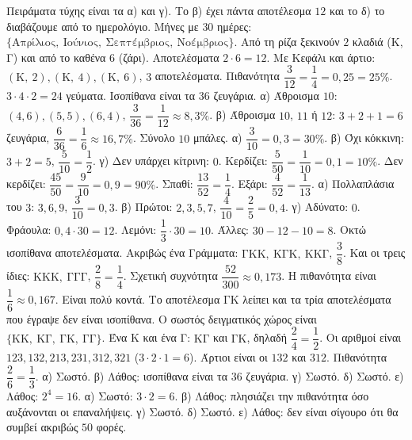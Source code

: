  Πειράματα τύχης είναι τα α) και γ). Το β) έχει πάντα αποτέλεσμα $12$ και το δ) το διαβάζουμε από το ημερολόγιο.
 Μήνες με $30$ ημέρες: $\{\text{Απρίλιος},\ \text{Ιούνιος},\ \text{Σεπτέμβριος},\ \text{Νοέμβριος}\}$.
 Από τη ρίζα ξεκινούν $2$ κλαδιά (Κ, Γ) και από το καθένα $6$ (ζάρι). Αποτελέσματα $2\cdot6=12$. Με Κεφάλι και άρτιο: $(\mathrm{Κ},\ 2),(\mathrm{Κ},\ 4),(\mathrm{Κ},\ 6)$, $3$ αποτελέσματα. Πιθανότητα $\dfrac{3}{12}=\dfrac{1}{4}=0{,}25=25\%$.
 $3\cdot4\cdot2=24$ γεύματα.
 Ισοπίθανα είναι τα $36$ ζευγάρια. α) Άθροισμα $10$: $(4,6),(5,5),(6,4)$, $\dfrac{3}{36}=\dfrac{1}{12}\approx8{,}3\%$. β) Άθροισμα $10$, $11$ ή $12$: $3+2+1=6$ ζευγάρια, $\dfrac{6}{36}=\dfrac{1}{6}\approx16{,}7\%$.
 Σύνολο $10$ μπάλες. α) $\dfrac{3}{10}=0{,}3=30\%$. β) Όχι κόκκινη: $3+2=5$, $\dfrac{5}{10}=\dfrac{1}{2}$. γ) Δεν υπάρχει κίτρινη: $0$.
 Κερδίζει: $\dfrac{5}{50}=\dfrac{1}{10}=0{,}1=10\%$. Δεν κερδίζει: $\dfrac{45}{50}=\dfrac{9}{10}=0{,}9=90\%$.
 Σπαθί: $\dfrac{13}{52}=\dfrac{1}{4}$. Εξάρι: $\dfrac{4}{52}=\dfrac{1}{13}$.
 α) Πολλαπλάσια του $3$: $3,6,9$, $\dfrac{3}{10}=0{,}3$. β) Πρώτοι: $2,3,5,7$, $\dfrac{4}{10}=\dfrac{2}{5}=0{,}4$. γ) Αδύνατο: $0$.
 Φράουλα: $0{,}4\cdot30=12$. Λεμόνι: $\dfrac{1}{3}\cdot30=10$. Άλλες: $30-12-10=8$.
 Οκτώ ισοπίθανα αποτελέσματα. Ακριβώς ένα Γράμματα: $\mathrm{ΓΚΚ},\ \mathrm{ΚΓΚ},\ \mathrm{ΚΚΓ}$, $\dfrac{3}{8}$. Και οι τρεις ίδιες: $\mathrm{ΚΚΚ},\ \mathrm{ΓΓΓ}$, $\dfrac{2}{8}=\dfrac{1}{4}$.
 Σχετική συχνότητα $\dfrac{52}{300}\approx0{,}173$. Η πιθανότητα είναι $\dfrac{1}{6}\approx0{,}167$. Είναι πολύ κοντά.
 Το αποτέλεσμα $\mathrm{ΓΚ}$ λείπει και τα τρία αποτελέσματα που έγραψε δεν είναι ισοπίθανα. Ο σωστός δειγματικός χώρος είναι $\{\mathrm{ΚΚ},\ \mathrm{ΚΓ},\ \mathrm{ΓΚ},\ \mathrm{ΓΓ}\}$. Ένα Κ και ένα Γ: $\mathrm{ΚΓ}$ και $\mathrm{ΓΚ}$, δηλαδή $\dfrac{2}{4}=\dfrac{1}{2}$.
 Οι αριθμοί είναι $123,132,213,231,312,321$ ($3\cdot2\cdot1=6$). Άρτιοι είναι οι $132$ και $312$. Πιθανότητα $\dfrac{2}{6}=\dfrac{1}{3}$.
 α) Σωστό. β) Λάθος: ισοπίθανα είναι τα $36$ ζευγάρια. γ) Σωστό. δ) Σωστό. ε) Λάθος: $2^4=16$.
 α) Σωστό: $3\cdot2=6$. β) Λάθος: πλησιάζει την πιθανότητα όσο αυξάνονται οι επαναλήψεις. γ) Σωστό. δ) Σωστό. ε) Λάθος: δεν είναι σίγουρο ότι θα συμβεί ακριβώς $50$ φορές.
